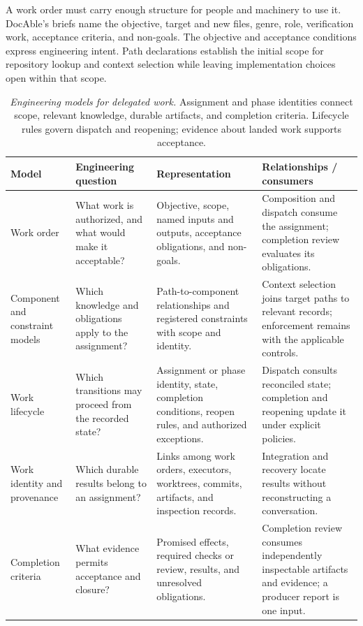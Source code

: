 A work order must carry enough structure for people and machinery to use it. DocAble's briefs name the objective, target and new files, genre, role, verification work, acceptance criteria, and non-goals. The objective and acceptance conditions express engineering intent. Path declarations establish the initial scope for repository lookup and context selection while leaving implementation choices open within that scope.

{\footnotesize
\begin{longtable}{@{}p{.18\linewidth}p{.22\linewidth}p{.25\linewidth}p{.27\linewidth}@{}}
\caption[Engineering models for delegated work]{\emph{Engineering models for delegated work.} Assignment and phase identities connect scope, relevant knowledge, durable artifacts, and completion criteria. Lifecycle rules govern dispatch and reopening; evidence about landed work supports acceptance.}\label{handbook-delegation-models}\\
\toprule
\textbf{Model} & \textbf{Engineering question} & \textbf{Representation} & \textbf{Relationships / consumers} \\
\midrule\endhead
Work order & What work is authorized, and what would make it acceptable? & Objective, scope, named inputs and outputs, acceptance obligations, and non-goals. & Composition and dispatch consume the assignment; completion review evaluates its obligations. \\
Component and constraint models & Which knowledge and obligations apply to the assignment? & Path-to-component relationships and registered constraints with scope and identity. & Context selection joins target paths to relevant records; enforcement remains with the applicable controls. \\
Work lifecycle & Which transitions may proceed from the recorded state? & Assignment or phase identity, state, completion conditions, reopen rules, and authorized exceptions. & Dispatch consults reconciled state; completion and reopening update it under explicit policies. \\
Work identity and provenance & Which durable results belong to an assignment? & Links among work orders, executors, worktrees, commits, artifacts, and inspection records. & Integration and recovery locate results without reconstructing a conversation. \\
Completion criteria & What evidence permits acceptance and closure? & Promised effects, required checks or review, results, and unresolved obligations. & Completion review consumes independently inspectable artifacts and evidence; a producer report is one input. \\
\bottomrule\end{longtable}
}


